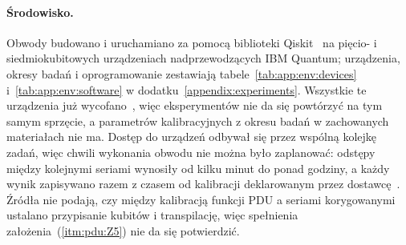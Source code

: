 \paragraph{Środowisko.}
Obwody budowano i uruchamiano za pomocą biblioteki Qiskit~\cite{Qiskit} na pięcio- i siedmiokubitowych urządzeniach nadprzewodzących IBM Quantum; urządzenia, okresy badań i oprogramowanie zestawiają tabele~\ref{tab:app:env:devices} i~\ref{tab:app:env:software} w dodatku~\ref{appendix:experiments}.
Wszystkie te urządzenia już wycofano~\cite{ibm_retired_qpus_2026}, więc eksperymentów nie da się powtórzyć na tym samym sprzęcie, a parametrów kalibracyjnych z okresu badań w zachowanych materiałach nie ma.
Dostęp do urządzeń odbywał się przez wspólną kolejkę zadań, więc chwili wykonania obwodu nie można było zaplanować: odstępy między kolejnymi seriami wynosiły od kilku minut do ponad godziny, a każdy wynik zapisywano razem z czasem od kalibracji deklarowanym przez dostawcę~\cite{werner_magisterka_2022}.
Źródła nie podają, czy między kalibracją funkcji PDU a seriami korygowanymi ustalano przypisanie kubitów i transpilację, więc spełnienia założenia~(\ref{itm:pdu:Z5}) nie da się potwierdzić.

